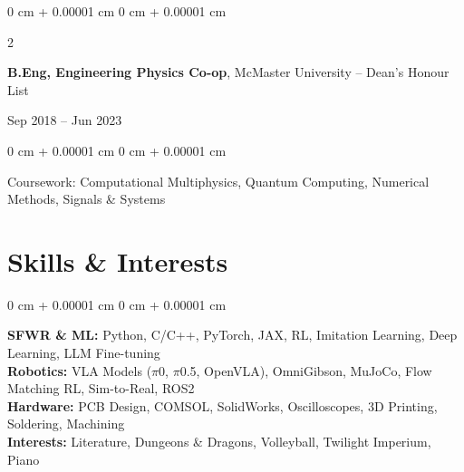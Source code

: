 \documentclass[10pt, letterpaper]{article}
\newenvironment{onecolentry}{
    \begin{adjustwidth}{
        0 cm + 0.00001 cm
    }{
        0 cm + 0.00001 cm
    }
}{
    \end{adjustwidth}
} %
\newenvironment{twocolentry}[2][]{
    \onecolentry
    \def\secondColumn{#2}
    \setcolumnwidth{\fill, 4.5 cm}
    \begin{paracol}{2}
}{
    \switchcolumn \raggedleft \secondColumn
    \end{paracol}
    \endonecolentry
} %
\begin{document}
    \vspace{0.2 cm}
    \begin{twocolentry}{Sep 2018 – Jun 2023}
        \textbf{B.Eng, Engineering Physics Co-op}, McMaster University -- Dean's Honour List
    \end{twocolentry}
    \begin{onecolentry}
        Coursework: Computational Multiphysics, Quantum Computing, Numerical Methods, Signals \& Systems
    \end{onecolentry}

\section{Skills \& Interests}
\begin{onecolentry}
    \textbf{SFWR \& ML:} Python, C/C++, PyTorch, JAX, RL, Imitation Learning, Deep Learning, LLM Fine-tuning\\
    \textbf{Robotics:} VLA Models ($\pi$0, $\pi$0.5, OpenVLA), OmniGibson, MuJoCo, Flow Matching RL, Sim-to-Real, ROS2\\
    \textbf{Hardware:} PCB Design, COMSOL, SolidWorks, Oscilloscopes, 3D Printing, Soldering, Machining\\
    \textbf{Interests:} Literature, Dungeons \& Dragons, Volleyball, Twilight Imperium, Piano
\end{onecolentry}
\end{document}
